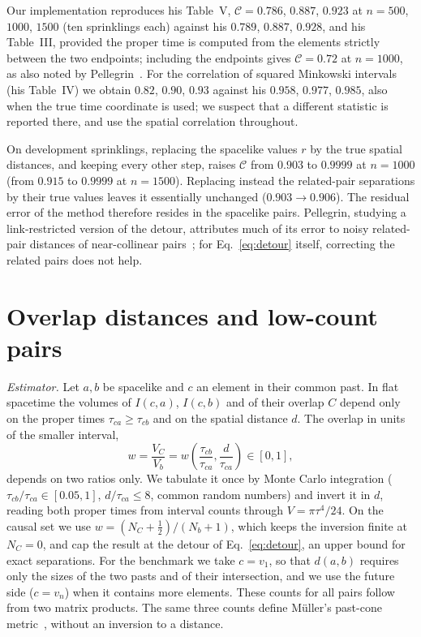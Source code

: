 \documentclass[prd,twocolumn,superscriptaddress,nofootinbib,amsmath,amssymb,floatfix]{revtex4-2}
\begin{document}
Our implementation reproduces his Table~V, $\mathcal C=0.786$, $0.887$, $0.923$ at $n=500$, $1000$, $1500$ (ten sprinklings each) against his $0.789$, $0.887$, $0.928$, and his Table~III, provided the proper time is computed from the elements strictly between the two endpoints; including the endpoints gives $\mathcal C=0.72$ at $n=1000$, as also noted by Pellegrin~\cite{Pellegrin26}. For the correlation of squared Minkowski intervals (his Table~IV) we obtain $0.82$, $0.90$, $0.93$ against his $0.958$, $0.977$, $0.985$, also when the true time coordinate is used; we suspect that a different statistic is reported there, and use the spatial correlation throughout.

On development sprinklings, replacing the spacelike values $r$ by the true spatial distances, and keeping every other step, raises $\mathcal C$ from $0.903$ to $0.9999$ at $n=1000$ (from $0.915$ to $0.9999$ at $n=1500$). Replacing instead the related-pair separations by their true values leaves it essentially unchanged ($0.903\to0.906$). The residual error of the method therefore resides in the spacelike pairs. Pellegrin, studying a link-restricted version of the detour, attributes much of its error to noisy related-pair distances of near-collinear pairs~\cite{Pellegrin26}; for Eq.~\eqref{eq:detour} itself, correcting the related pairs does not help.

\section{Overlap distances and low-count pairs}\label{sec:overlap}
\emph{Estimator.} Let $a,b$ be spacelike and $c$ an element in their common past. In flat spacetime the volumes of $I(c,a)$, $I(c,b)$ and of their overlap $C$ depend only on the proper times $\tau_{ca}\geq\tau_{cb}$ and on the spatial distance $d$. The overlap in units of the smaller interval,
\begin{equation}
w=\frac{V_C}{V_b}=w\!\left(\frac{\tau_{cb}}{\tau_{ca}},\frac{d}{\tau_{ca}}\right)\in[0,1],
\end{equation}
depends on two ratios only. We tabulate it once by Monte Carlo integration ($\tau_{cb}/\tau_{ca}\in[0.05,1]$, $d/\tau_{ca}\le8$, common random numbers) and invert it in $d$, reading both proper times from interval counts through $V=\pi\tau^4/24$. On the causal set we use $w=(N_C+\tfrac12)/(N_b+1)$, which keeps the inversion finite at $N_C=0$, and cap the result at the detour of Eq.~\eqref{eq:detour}, an upper bound for exact separations. For the benchmark we take $c=v_1$, so that $d(a,b)$ requires only the sizes of the two pasts and of their intersection, and we use the future side ($c=v_n$) when it contains more elements. These counts for all pairs follow from two matrix products. The same three counts define M\"uller's past-cone metric~\cite{Muller25}, without an inversion to a distance.
\end{document}
